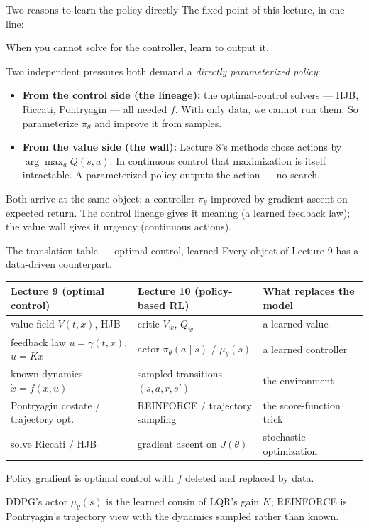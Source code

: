\documentclass[10pt, aspectratio=169]{beamer}
\begin{document}
\begin{frame}{Two reasons to learn the policy directly}
The fixed point of this lecture, in one line:
\begin{center}\large
\alert{When you cannot solve for the controller, learn to output it.}
\end{center}
\medskip

\pause
Two independent pressures both demand a \emph{directly parameterized policy}:
\begin{itemize}\setlength\itemsep{3pt}
\item \textbf{From the control side (the lineage):} the optimal-control solvers --- HJB, Riccati, Pontryagin --- all needed $f$. With only data, we cannot run them. So parameterize $\pi_\theta$ and improve it from samples.
\item \textbf{From the value side (the wall):} Lecture 8's methods chose actions by $\arg\max_a Q(s,a)$. In continuous control that maximization is itself intractable. A parameterized policy \alert{outputs} the action --- no search.
\end{itemize}
\medskip

\pause
Both arrive at the same object: a controller $\pi_\theta$ improved by gradient ascent on expected return. The control lineage gives it meaning (a learned feedback law); the value wall gives it urgency (continuous actions).
\end{frame}

\begin{frame}{The translation table --- optimal control, learned}
Every object of Lecture 9 has a data-driven counterpart.
\medskip
\begin{center}\scriptsize\renewcommand{\arraystretch}{1.55}
\begin{tabular}{l|l|l}
\textbf{Lecture 9 (optimal control)} & \textbf{Lecture 10 (policy-based RL)} & \textbf{What replaces the model} \\
\hline
value field $V(t,x)$, HJB & critic $V_w,\,Q_w$ & a learned value \\
feedback law $u=\gamma(t,x)$, $u=Kx$ & actor $\pi_\theta(a\mid s)$ / $\mu_\theta(s)$ & a learned controller \\
known dynamics $\dot x = f(x,u)$ & sampled transitions $(s,a,r,s')$ & the environment \\
Pontryagin costate / trajectory opt.\ & REINFORCE / trajectory sampling & the score-function trick \\
solve Riccati / HJB & gradient ascent on $J(\theta)$ & stochastic optimization \\
\end{tabular}
\end{center}
\medskip

\pause
\begin{center}\large
\alert{Policy gradient is optimal control with $f$ deleted and replaced by data.}
\end{center}
DDPG's actor $\mu_\theta(s)$ is the learned cousin of LQR's gain $K$; REINFORCE is Pontryagin's trajectory view with the dynamics sampled rather than known.
\end{frame}
\end{document}
